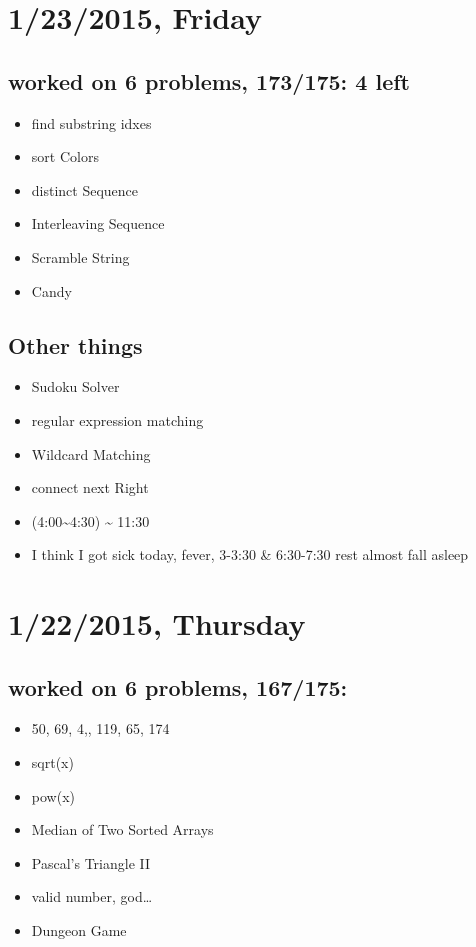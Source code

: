 \documentclass[9pt,b5paper]{article}
\begin{document}
\section{1/23/2015, Friday}
\label{sec-3}
\subsection{worked on 6 problems, 173/175: 4 left}
\label{sec-3-1}
\begin{itemize}
\item find substring idxes
\item sort Colors
\item distinct Sequence
\item Interleaving Sequence
\item Scramble String
\item Candy
\end{itemize}
\subsection{Other things}
\label{sec-3-2}
\begin{itemize}
\item Sudoku Solver
\item regular expression matching
\item Wildcard Matching
\item connect next Right
\item (4:00\textasciitilde{}4:30) \textasciitilde{} 11:30
\item I think I got sick today, fever, 3-3:30 \& 6:30-7:30 rest almost fall asleep
\end{itemize}
\section{1/22/2015, Thursday}
\label{sec-4}
\subsection{worked on 6 problems, 167/175:}
\label{sec-4-1}
\begin{itemize}
\item 50, 69, 4,, 119, 65, 174
\item sqrt(x)
\item pow(x)
\item Median of Two Sorted Arrays
\item Pascal's Triangle II
\item valid number, god\ldots{}
\item Dungeon Game
\end{itemize}
\end{document}
